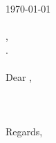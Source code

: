 \documentclass{article}
\begin{document}
    

    
    \header
    
    \bigskip\large
    
    \begin{singlespace}
        \today \\\\
        
        \company, \\
        \companycity. \\\\
        Dear \recipientname, \\\\
         \\\\
        Regards, \\
        \name
    \end{singlespace}
\end{document}
